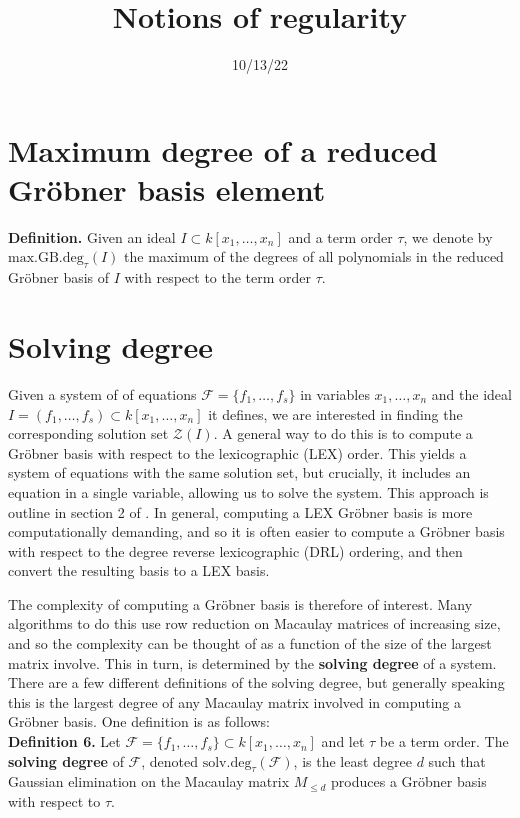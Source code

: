 \documentclass[11pt]{article}
\title{Notions of regularity}
\date{10/13/22}
\newcommand{\F}{\mathcal{F}}
\newcommand{\sdeg}{\text{solv.deg}}
\newcommand{\mdeg}{\text{max.GB.deg}}
\begin{document}
\maketitle

\section*{Maximum degree of a reduced Gröbner basis element}

\noindent \textbf{Definition.} Given an ideal $I \subset k[x_1, \dots, x_n]$ and a term order $\tau$, we denote by $\mdeg_\tau(I)$ the maximum of the degrees of all polynomials in the reduced Gröbner basis of $I$ with respect to the term order $\tau$. 

\section*{Solving degree}

Given a system of of equations $\mathcal{F} = \{f_1, \dots, f_s\}$ in variables $x_1, \dots, x_n$ and the ideal $I = (f_1, \dots, f_s) \subset k[x_1, \dots, x_n]$ it defines, we are interested in finding the corresponding solution set $\mathcal{Z}(I)$. A general way to do this is to compute a Gröbner basis with respect to the lexicographic (LEX) order. This yields a system of equations with the same solution set, but crucially, it includes an equation in a single variable, allowing us to solve the system. This approach is outline in section 2 of \cite{caminata2020solving}. In general, computing a LEX Gröbner basis is more computationally demanding, and so it is often easier to compute a Gröbner basis with respect to the degree reverse lexicographic (DRL) ordering, and then convert the resulting basis to a LEX basis. 

The complexity of computing a Gröbner basis is therefore of interest. Many algorithms to do this use row reduction on Macaulay matrices of increasing size, and so the complexity can be thought of as a function of the size of the largest matrix involve. This in turn, is determined by the \textbf{solving degree} of a system. There are a few different definitions of the solving degree, but generally speaking this is the largest degree of any Macaulay matrix involved in computing a Gröbner basis. One definition is as follows: \\

\noindent \textbf{\cite{caminata2020solving} Definition 6.} Let $\mathcal{F} = \{f_1, \dots, f_s\} \subset k[x_1, \dots, x_n]$ and let $\tau$ be a term order. The \textbf{solving degree} of $\mathcal{F}$, denoted $\sdeg_\tau(\F)$, is the least degree $d$ such that Gaussian elimination on the Macaulay matrix $M_{\leq d}$ produces a Gröbner basis with respect to $\tau$. \\
\end{document}
